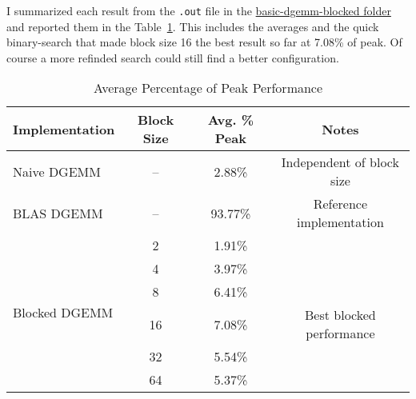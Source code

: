 I summarized each result from the \texttt{.out} file in the \href{./../src/3-Optimize-Matrix-Matrix-Mult/basic-dgemm-blocked}{basic-dgemm-blocked folder} and reported them in the Table~\ref{tab:performance-summary}. This includes the averages and the quick binary-search that made block size 16 the best result so far at 7.08\% of peak. Of course a more refinded search could still find a better configuration.

\begin{table}[h]
\centering
\caption{Average Percentage of Peak Performance}
\label{tab:performance-summary}
\begin{tabular}{|l|c|c|c|}
\hline
\textbf{Implementation} & \textbf{Block Size} & \textbf{Avg. \% Peak} & \textbf{Notes} \\
\hline
\hline
Naive DGEMM & -- & 2.88\% & Independent of block size \\
\hline
BLAS DGEMM & -- & 93.77\% & Reference implementation \\
\hline
\hline
\multirow{6}{*}{Blocked DGEMM} 
& 2  & 1.91\% & \\
\cline{2-4}
& 4  & 3.97\% & \\
\cline{2-4}
& 8  & 6.41\% & \\
\cline{2-4}
& 16 & 7.08\% & Best blocked performance \\
\cline{2-4}
& 32 & 5.54\% & \\
\cline{2-4}
& 64 & 5.37\% & \\
\hline
\end{tabular}
\end{table}


